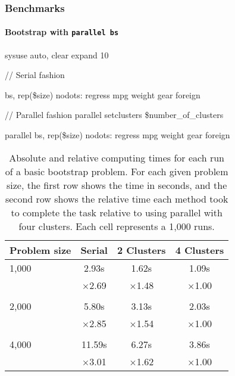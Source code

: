 \documentclass[9pt,\ExtraDocOpts]{beamer}
\begin{document}
\begin{frame}[t]
\frametitle{Benchmarks}
\framesubtitle{Bootstrap with \tt{parallel bs}}
\begin{semiverbatim}
	\scriptsize
sysuse auto, clear
expand 10


// Serial fashion

bs, rep(\$size) nodots: regress mpg weight gear foreign


// Parallel fashion
parallel setclusters \$number\_of\_clusters

parallel bs, rep(\$size) nodots: regress mpg weight gear foreign
\end{semiverbatim}


\begin{table}[!h]
\centering\begin{tabular}{l*{3}{c}}
	\toprule
	Problem size & Serial & 2 Clusters & 4 Clusters\\\midrule
	1,000 &   2.93s &   1.62s &   1.09s \\    
	&  $\times$2.69 &  $\times$1.48 &  $\times$1.00 \\ \\
	2,000 &   5.80s &   3.13s &   2.03s \\    
	&  $\times$2.85 &  $\times$1.54 &  $\times$1.00 \\ \\
	4,000 &  11.59s &   6.27s &   3.86s \\    
	&  $\times$3.01 &  $\times$1.62 &  $\times$1.00 \\
	\bottomrule
\end{tabular}
\caption{Absolute and relative computing times for each run of a basic bootstrap problem. For each given problem size, the first row shows the time in seconds, and the second row shows the relative time each method took to complete the task relative to using parallel with four clusters. Each cell represents a 1,000 runs.}
	\end{table}
	
\end{frame}
\end{document}
